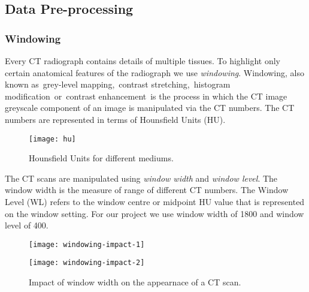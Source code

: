 \documentclass[pdflatex,sn-mathphys]{sn-jnl}%
\theoremstyle{thmstyleone}%
\theoremstyle{thmstyletwo}%
\theoremstyle{thmstylethree}%
\begin{document}
\subsection{Data Pre-processing}

\subsubsection{Windowing}

Every CT radiograph contains details of multiple tissues. To highlight only certain anatomical features of the radiograph we use \emph{windowing}. Windowing, also known as grey-level mapping, contrast stretching, histogram modification or contrast enhancement is the process in which the CT image greyscale component of an image is manipulated via the CT numbers. The CT numbers are represented in terms of Hounsfield Units (HU).

\vspace*{-5mm}
\begin{figure}[H]
 \begin{minipage}[c]{1\textwidth}
 \centering
    \texttt{[image: hu]}
    \caption{\centering\footnotesize{ Hounsfield Units for different mediums. }}
    \label{fig:mesh2}
\end{minipage}
\end{figure}

\vspace*{-5mm}
The CT scans are manipulated using \emph{window width} and \emph{window level}. The window width is the measure of range of different CT numbers. The Window Level (WL) refers to the window centre or midpoint HU value that is represented on the window setting. For our project we use window width of 1800 and window level of 400\cite{DBLP:journals/corr/abs-1812-00572}.

\vspace*{-5mm}
\begin{figure}[H]
\centering
\begin{minipage}[c]{0.5\textwidth}
    \centering
    \texttt{[image: windowing-impact-1]}
    
    \label{fig:mesh3.1}
\end{minipage}\hfill
\begin{minipage}[c]{0.5\textwidth}
    \centering
    \texttt{[image: windowing-impact-2]}
    \label{fig:mesh3.2}
\end{minipage}
\caption{\centering\footnotesize{Impact of window width on the appearnace of a CT scan. }}
\end{figure}
\vspace*{-10mm}
\end{document}
